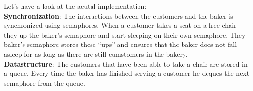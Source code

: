 \documentclass[11pt]{article}
\begin{document}
Let's have a look at the acutal implementation:\\

\textbf{Synchronization}: The interactions between the customers and the baker is synchronized using semaphores. When a customer takes a seat on a free chair they up the baker's semaphore and start sleeping on their own semaphore. They baker's semaphore stores these ``ups'' and ensures that the baker does not fall asleep for as long as there are still cumstomers in the bakery.\\

\textbf{Datastructure}: The customers that have been able to take a chair are stored in a queue. Every time the baker has finished serving a customer he deques the next semaphore from the queue.\\
\end{document}
